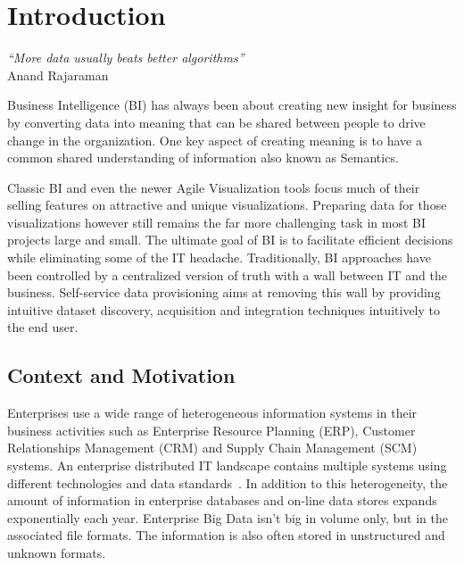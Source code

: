 \chapter{Introduction}  \label{ch:intro}
\graphicspath{{introduction/figures/}}

\begin{flushright}
\textit{``More data usually beats better algorithms''}\\
 Anand Rajaraman

\end{flushright}

Business Intelligence (BI) has always been about creating new insight for business by converting data into meaning that can be shared between people to drive change in the organization. One key aspect of creating meaning is to have a common shared understanding of information also known as Semantics.

Classic BI and even the newer Agile Visualization tools focus much of their selling features on attractive and unique visualizations. Preparing data for those visualizations however still remains the far more challenging task in most BI projects large and small. The ultimate goal of BI is to facilitate efficient decisions while eliminating some of the IT headache. Traditionally, BI approaches have been controlled by a centralized version of truth with a wall between IT and the business. Self-service data provisioning aims at removing this wall by providing intuitive dataset discovery, acquisition and integration techniques intuitively to the end user.

\section{Context and Motivation} \label{sec:motivation}

Enterprises use a wide range of heterogeneous information systems in their business activities such as Enterprise Resource Planning (ERP), Customer Relationships Management (CRM) and Supply Chain Management (SCM) systems. An enterprise distributed IT landscape contains multiple systems using different technologies and data standards~\cite{Mihindukulasooriya:COLD:13}. In addition to this heterogeneity, the amount of information in enterprise databases and on-line data stores expands exponentially each year. Enterprise Big Data isn't big in volume only, but in the associated file formats. The information is also often stored in unstructured and unknown formats.

